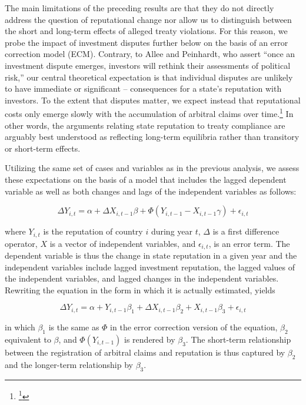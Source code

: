 \documentclass[12pt,onesided]{amsart}
\begin{document}
The main limitations of the preceding results are that they do not directly address the question of reputational change nor allow us to distinguish between the short and long-term effects of alleged treaty violations. For this reason, we probe the impact of investment disputes further below on the basis of an error correction model (ECM). Contrary, to Allee and Peinhardt, who assert ``once an investment dispute emerges, investors will rethink their assessments of political risk,'' our central theoretical expectation is that individual disputes are unlikely to have immediate or significant -- consequences for a state's reputation with investors. To the extent that disputes matter, we expect instead that reputational costs only emerge slowly with the accumulation of arbitral claims over time.\footnote{\footnote{\citet[p. 402]{allee:peinhardt:2011}}} In other words, the arguments relating state reputation to treaty compliance are arguably best understood as reflecting long-term equilibria rather than transitory or short-term effects.

Utilizing the same set of cases and variables as in the previous analysis, we assess these expectations on the basis of a model that includes the lagged dependent variable as well as both changes and lags of the independent variables as follows:

\begin{equation}
\Delta Y_{i,t} = \alpha + \Delta X_{i,t-1} \beta + \Phi(Y_{i,t-1} - X_{i,t-1} \gamma) + \epsilon_{i,t}
\end{equation}

where $Y_{i,t}$ is the reputation of country $i$ during year $t$, $\Delta$ is a first difference operator, $X$ is a vector of independent variables, and $\epsilon_{i,t}$, is an error term. The dependent variable is thus the change in state reputation in a given year and the independent variables include lagged investment reputation, the lagged values of the independent variables, and lagged changes in the independent variables. Rewriting the equation in the form in which it is actually estimated, yields

\begin{equation}
\Delta Y_{i,t} = \alpha + Y_{i,t-1} \beta_{1} + \Delta X_{i,t-1} \beta_{2} + X_{i, t-1} \beta_{3} + \epsilon_{i,t}
\end{equation}

in which $\beta_{1}$ is the same as $\Phi$ in the error correction version of the equation, $\beta_{2}$ equivalent to $\beta$, and $\Phi(Y_{i,t-1})$ is rendered by $\beta_{3}$. The short-term relationship between the registration of arbitral claims and reputation is thus captured by $\beta_{2}$  and the longer-term relationship by $\beta_{3}$.
\end{document}
